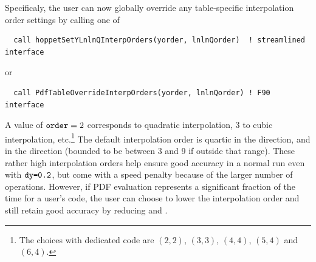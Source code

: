 


Specificaly, the user can now globally override any table-specific interpolation order
settings by calling one of
\begin{lstlisting}
  call hoppetSetYLnlnQInterpOrders(yorder, lnlnQorder)  ! streamlined interface
\end{lstlisting}
or
\begin{lstlisting}
  call PdfTableOverrideInterpOrders(yorder, lnlnQorder) ! F90 interface
\end{lstlisting}
A value of $\texttt{order}=2$ corresponds to quadratic interpolation, $3$ to
cubic interpolation, etc.\footnote{The 
  choices with dedicated code are $(2,2)$, $(3,3)$, $(4,4)$, $(5,4)$
  and $(6,4)$.}
%
The default interpolation order is quartic in the 
direction, and  in the  direction (bounded
to be between 3 and 9 if outside that range).
%
These rather high interpolation orders help ensure good accuracy in a normal
\hoppet{} run even with $\texttt{dy=0.2}$, but come with a speed penalty
because of the larger number of operations.
%
However, if PDF evaluation represents a significant fraction of the
time for a user's code, the user can choose to lower the interpolation
order and still retain good accuracy by reducing  and
.

